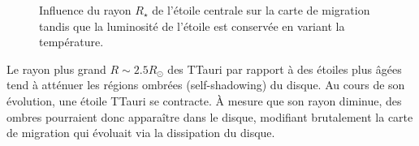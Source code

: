 \begin{figure}[htbp]
\centering
{}
\hfill
{}

\hfill
{}
\caption[Influence du rayon stellaire sur la carte de migration à flux stellaire constant.]{Influence du rayon $R_\star$ de
l'étoile centrale sur la carte de migration tandis que la luminosité de l'étoile est
conservée en variant la température. }\label{fig:map_TTauri_radius}
\end{figure}

Le rayon plus grand $R\sim 2.5R_\odot$ des TTauri par rapport à des étoiles plus âgées  tend à atténuer les régions ombrées (\og self-shadowing\fg) du disque. Au cours de son évolution, une étoile TTauri se contracte. À mesure que son rayon diminue, des ombres pourraient donc apparaître dans le disque, modifiant brutalement la carte de migration qui évoluait via la dissipation du disque.

